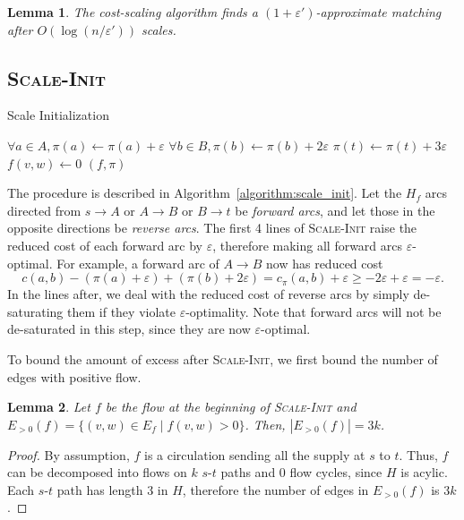 \documentclass[11pt]{article}
\def\eps{\varepsilon}
\theoremstyle{plain}
\newtheorem{lemma}{Lemma}[section]
\numberwithin{figure}{section}
\begin{document}
\begin{lemma}
\label{lemma:goldberg_scales}
The cost-scaling algorithm finds a $(1 + \eps')$-approximate matching after
$O(\log(n/\eps'))$ scales.
\end{lemma}

\subsection{\textsc{Scale-Init}}

\begin{algorithm}
\caption{Scale Initialization}
\label{algorithm:scale_init}
\begin{algorithmic}[1]
	\State $\forall a \in A, \pi(a) \gets \pi(a) + \eps$
	\State $\forall b \in B, \pi(b) \gets \pi(b) + 2\eps$
	\State $\pi(t) \gets \pi(t) + 3\eps$
	\Statex %
		\If{$c_\pi(w, v) < -\eps$}
			\State $f(v, w) \gets 0$
		\EndIf
	\EndFor
	\State\Return $(f, \pi)$
\EndFunction
\end{algorithmic}
\end{algorithm}

The procedure is described in Algorithm~\ref{algorithm:scale_init}.
Let the $H_f$ arcs directed from $s \to A$ or $A \to B$ or $B \to t$ be
\emph{forward arcs}, and let those in the opposite directions be
\emph{reverse arcs}.
The first 4 lines of \textsc{Scale-Init} raise the reduced cost of each
forward arc by $\eps$, therefore making all forward arcs $\eps$-optimal.
For example, a forward arc of $A \to B$ now has reduced cost
\begin{equation*}
	c(a, b) - (\pi(a) + \eps) + (\pi(b) + 2\eps)
	= c_\pi(a, b) + \eps
	\geq -2\eps + \eps
	= -\eps.
\end{equation*}
In the lines after, we deal with the reduced cost of reverse arcs by simply
de-saturating them if they violate $\eps$-optimality.
Note that forward arcs will not be de-saturated in this step, since they are
now $\eps$-optimal.

To bound the amount of excess after \textsc{Scale-Init}, we first bound the
number of edges with positive flow.
\begin{lemma}
\label{lemma:support_size_start}
Let $f$ be the flow at the beginning of \textsc{Scale-Init} and
$E_{>0}(f) = \{(v, w) \in E_f \mid f(v, w) > 0\}$.
Then, $|E_{>0}(f)| = 3k$.
\end{lemma}

\begin{proof}
By assumption, $f$ is a circulation sending all the supply at $s$ to $t$.
Thus, $f$ can be decomposed into flows on $k$ $s$-$t$ paths and 0 flow cycles,
since $H$ is acylic.
Each $s$-$t$ path has length 3 in $H$, therefore the number of edges in
$E_{>0}(f)$ is $3k$.
\end{proof}
\end{document}
